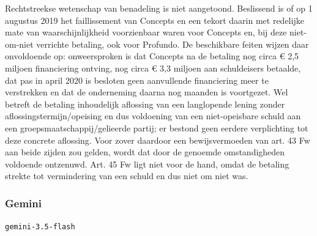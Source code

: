 \documentclass[
  dutch,
  a4paper,
]{article}
\begin{document}
Rechtstreekse wetenschap van benadeling is niet aangetoond. Beslissend is of op 1 augustus 2019 het faillissement van Concepts en een tekort daarin met redelijke mate van waarschijnlijkheid voorzienbaar waren voor Concepts en, bij deze niet-om-niet verrichte betaling, ook voor Profundo. De beschikbare feiten wijzen daar onvoldoende op: onweersproken is dat Concepts na de betaling nog circa € 2,5 miljoen financiering ontving, nog circa € 3,3 miljoen aan schuldeisers betaalde, dat pas in april 2020 is besloten geen aanvullende financiering meer te verstrekken en dat de onderneming daarna nog maanden is voortgezet. Wel betreft de betaling inhoudelijk aflossing van een langlopende lening zonder aflossingstermijn/opeising en dus voldoening van een niet-opeisbare schuld aan een groepsmaatschappij/gelieerde partij; er bestond geen eerdere verplichting tot deze concrete aflossing. Voor zover daardoor een bewijsvermoeden van art. 43 Fw aan beide zijden zou gelden, wordt dat door de genoemde omstandigheden voldoende ontzenuwd. Art. 45 Fw ligt niet voor de hand, omdat de betaling strekte tot vermindering van een schuld en dus niet om niet was.

\newpage


\subsubsection{Gemini}\label{gemini-12}

\texttt{gemini-3.5-flash}
\end{document}
